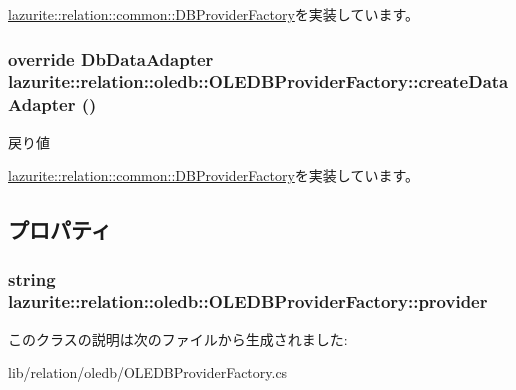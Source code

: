 \hyperlink{classlazurite_1_1relation_1_1common_1_1_d_b_provider_factory_a0b8ab4dd41d983170ee3c5903701597f}{lazurite::relation::common::DBProviderFactory}を実装しています。\hypertarget{classlazurite_1_1relation_1_1oledb_1_1_o_l_e_d_b_provider_factory_a38fa9d782201330de88cf58b84f16df2}{
\subsubsection[{createDataAdapter}]{\setlength{\rightskip}{0pt plus 5cm}override DbDataAdapter lazurite::relation::oledb::OLEDBProviderFactory::createDataAdapter ()}}
\label{classlazurite_1_1relation_1_1oledb_1_1_o_l_e_d_b_provider_factory_a38fa9d782201330de88cf58b84f16df2}
\begin{DoxyReturn}{戻り値}

\end{DoxyReturn}


\hyperlink{classlazurite_1_1relation_1_1common_1_1_d_b_provider_factory_a7343964afac875d0f5d665879c26f38f}{lazurite::relation::common::DBProviderFactory}を実装しています。

\subsection{プロパティ}
\hypertarget{classlazurite_1_1relation_1_1oledb_1_1_o_l_e_d_b_provider_factory_a536ab20f0ab680c04a69b0ce0f4dc15d}{
\subsubsection[{provider}]{\setlength{\rightskip}{0pt plus 5cm}string lazurite::relation::oledb::OLEDBProviderFactory::provider}}
\label{classlazurite_1_1relation_1_1oledb_1_1_o_l_e_d_b_provider_factory_a536ab20f0ab680c04a69b0ce0f4dc15d}


このクラスの説明は次のファイルから生成されました:\begin{DoxyCompactItemize}
\item 
lib/relation/oledb/OLEDBProviderFactory.cs\end{DoxyCompactItemize}
